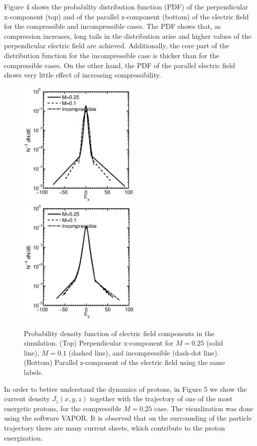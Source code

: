 \documentclass[%
aip,pop,amsmath,amssymb,
 reprint,%
]{revtex4-1}
\begin{document}
{{Figure 4 shows the probability distribution function (PDF) of the
perpendicular x-component (top) and of the parallel z-component (bottom) 
of the electric field 
for the compressible and incompressible cases. The PDF shows that, as compression increases,
long tails in the distribution arise and higher values of the perpendicular electric field 
are achieved. Additionally, the core part of the distribution function for the incompressible 
case is thicker than for the compressible cases. On the other hand, the PDF of the parallel electric field shows very 
little effect of increasing compressibility.

\begin{figure}
\begin{center}
{\includegraphics[width = 2.3in]{./Figures/Fig4_b}}
{\includegraphics[width = 2.31in]{./Figures/Fig4_2}}
\caption{Probability density function of electric field components 
in the simulation. (Top) Perpendicular x-component 
for $M=0.25$ (solid line), $M=0.1$ (dashed line), and incompressible 
(dash-dot line). (Bottom) Parallel z-component of the electric field 
using the same labels.}
\end{center}
\label{mean square velocity}
\end{figure}


In order to better understand the dynamics of protons, in Figure
5 we show the current density $J_z(x,y,z)$ together
with the trajectory of one of the most energetic protons,
for the compressible $M=0.25$ case. The visualization was done using the software
VAPOR\cite{vapor}. It is observed that on the surrounding of the particle trajectory 
there are many current sheets, which contribute to the proton energization.

}}
\end{document}
